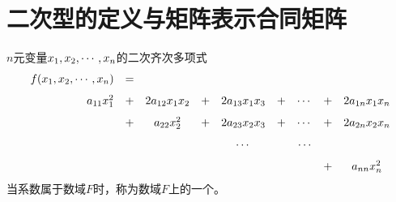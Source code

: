 \section{二次型的定义与矩阵表示\quad 合同矩阵}

\begin{frame}
  
    \begin{dingyi}[二次型]
      $n$元变量$x_1,x_2,\cdots,x_n$的二次齐次多项式
      $$
      \begin{array}{rcccccccc}
        f(x_1,x_2,\cdots,x_n) &=& \\[0.1in]
        a_{11}x_1^2&+&2a_{12}x_1x_2&+&2a_{13}x_1x_3&+&\cdots&+&2a_{1n}x_1x_n\\[0.1in]
        &+&a_{22}x_2^2&+&2a_{23}x_2x_3&+&\cdots&+&2a_{2n}x_2x_n\\[0.1in]
        &&&&\cdots&&\cdots\\[0.1in]
        &&&&&&&+&a_{nn}x_n^2
      \end{array}
      $$
     当系数属于数域$F$时，称为数域$F$上的一个。
    \end{dingyi}
  
\end{frame}


